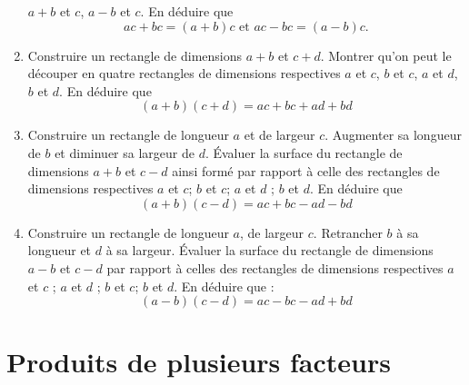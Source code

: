 \documentclass[12 pt]{report}
\theoremstyle{plain}
\newcounter{n}
\begin{document}
\begin{enumerate}
$a+b$ et $c$, $a-b$ et $c$. En déduire que 
\[ ac + bc = (a + b)c\text{    et    } ac - bc = (a - b) c.\]
\item Construire un rectangle de dimensions $a + b$ 
et $c + d$. Montrer qu'on peut le découper en quatre
rectangles de dimensions respectives $a$ et $c$, 
$b$ et $c$, $a$ et $d$, $b$ et $d$. En déduire que 
\[ (a + b)(c + d) = ac + bc + ad + bd\]
\item Construire un rectangle de longueur $a$ et de
largeur $c$. Augmenter sa longueur de $b$ et 
diminuer sa largeur de $d$. Évaluer la surface du 
rectangle de dimensions $a + b$ et $c - d$ ainsi 
formé par rapport à celle des rectangles de dimensions
respectives $a$ et $c$; $b$ et $c$; $a$ et $d$ ; $b$
et $d$. En déduire que 
\[ (a + b)(c - d) = ac + bc - ad - bd\]
\item Construire un rectangle de longueur $a$, 
de largeur $c$. Retrancher $b$ à sa longueur et 
$d$ à sa largeur. Évaluer la surface du rectangle 
de dimensions $a - b$ et $c - d$ par rapport à 
celles des rectangles de dimensions respectives 
$a$ et $c$ ; $a$ et $d$ ; $b$ et $c$; $b$ et $d$. 
En déduire que : 
\[ (a - b)(c - d) = ac - bc - ad + bd\]

 \end{enumerate}
 \chapter{Produits de plusieurs facteurs}
 
\end{document}
